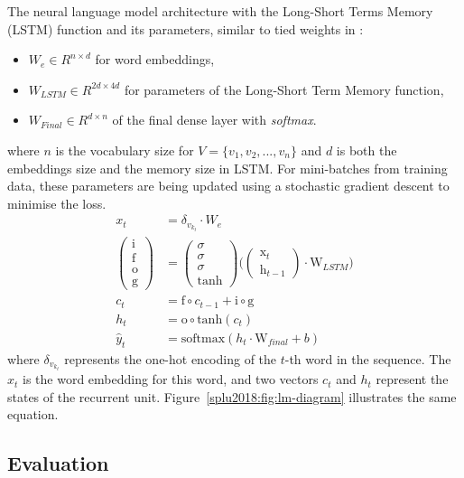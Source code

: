 The neural language model architecture with the Long-Short Terms Memory (LSTM) function and its parameters, similar to tied weights in \cite{gal2016theoretically}:
\begin{itemize}[topsep=0em,itemsep=0em,partopsep=0em,parsep=0em]
  \item $W_e \in {R}^{n \times d}$ for word embeddings,
  \item $W_{LSTM} \in {R}^{2d \times 4d}$ for parameters of the Long-Short Term
  Memory function,
  \item $W_{Final} \in {R}^{d \times n}$ of the final dense layer with
  \emph{softmax}.
\end{itemize}
\noindent where $n$ is the vocabulary size for $V = \{ v_1, v_2, ..., v_{n} \}$ and $d$
is both the embeddings size and the memory size in LSTM.
For mini-batches from training data, these parameters are being updated using a
stochastic gradient descent to minimise the loss.
\begin{align}\label{splu2018:eq:lm-parameters}
x_{t} &= \delta_{v_{k_t}} \cdot W_e \\
\begin{pmatrix}
\text{i} \\
\text{f} \\
\text{o} \\
\text{g}
\end{pmatrix}
& =
\begin{pmatrix}
\sigma \\
\sigma \\
\sigma \\
\text{tanh}
\end{pmatrix}
\bigg(
\begin{pmatrix}
\text{x}_t \\
\text{h}_{t-1}
\end{pmatrix}
\cdot
\text{W}_{LSTM}
\bigg) \\
c_t & = \text{f} \circ c_{t-1} + \text{i} \circ \text{g} \\
h_t & = \text{o} \circ \text{tanh}(c_t) \\
\hat{y}_t & = \text{softmax}(h_t \cdot \text{W}_{final} + b)
\end{align}
\noindent where $\delta_{v_{k_t}}$ represents the one-hot encoding of the $t$-th word in
the sequence. The $x_{t}$ is the word embedding for this word, and two vectors $c_t$ and $h_t$ represent the states of the recurrent unit. Figure~\ref{splu2018:fig:lm-diagram} illustrates the same equation.

\subsection*{Evaluation}\label{splu2018:sec:evaluation-variation}

